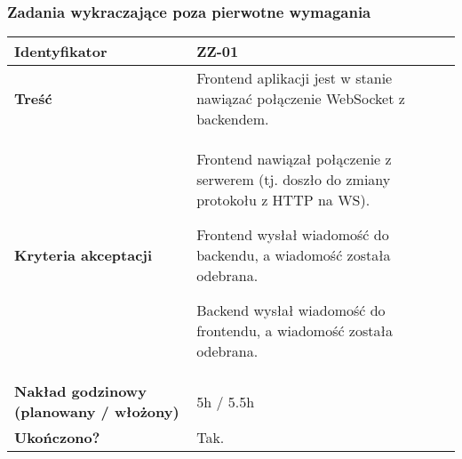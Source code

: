 \subsubsection{Zadania wykraczające poza pierwotne wymagania}

\leavevmode\hbox{}

\begin{tabular}{ | l | l | }
 \hline
   \textbf{Identyfikator} &
   ZZ-01
   \\

 \hline
   \textbf{Treść} & \parbox[t]{11.5cm}{\strut
     Frontend aplikacji jest w stanie nawiązać połączenie WebSocket z backendem.
   \strut}\\

 \hline
   \parbox[t]{4cm}{\textbf{Kryteria akceptacji}} & \parbox[t]{11.5cm}{\strut
     \begin{enumreq}
       \item Frontend nawiązał połączenie z serwerem (tj. doszło do
       zmiany protokołu z HTTP na WS).
       \item Frontend wysłał wiadomość do backendu, a wiadomość została
       odebrana.
       \item Backend wysłał wiadomość do frontendu, a wiadomość została
       odebrana.
     \end{enumreq}
     \strut}
   \\

   \hline
     \parbox[t]{4cm}{\textbf{Nakład godzinowy (planowany / włożony)}} & \parbox[t]{11.5cm}{\strut
       5h / 5.5h
     \strut}\\

   \hline
     \parbox[t]{4cm}{\textbf{Ukończono?}} &
     \parbox[t]{11.5cm}{\strut
       Tak.
     \strut}\\

   \hline
 \end{tabular}

 \vspace{1em}

